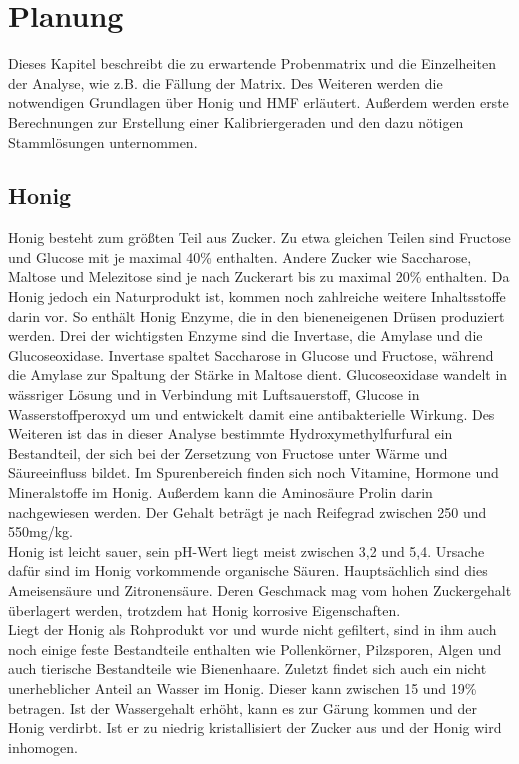 \chapter{Planung}

\label{chap:Planung}
Dieses Kapitel beschreibt die zu erwartende Probenmatrix und die Einzelheiten der Analyse, wie z.B. die Fällung der Matrix. Des Weiteren werden die notwendigen Grundlagen über Honig und HMF erläutert. Außerdem werden erste Berechnungen zur Erstellung einer Kalibriergeraden und den dazu nötigen Stammlösungen unternommen.

\section{Honig}
Honig besteht zum größten Teil aus Zucker. Zu etwa gleichen Teilen sind Fructose und Glucose mit je maximal 40\% enthalten. Andere Zucker wie Saccharose, Maltose und Melezitose sind je nach Zuckerart bis zu maximal 20\% enthalten. Da Honig jedoch ein Naturprodukt ist, kommen noch zahlreiche weitere Inhaltsstoffe darin vor. So enthält Honig Enzyme, die in den bieneneigenen Drüsen produziert werden. Drei der wichtigsten Enzyme sind die Invertase, die Amylase und die Glucoseoxidase. Invertase spaltet Saccharose in Glucose und Fructose, während die Amylase zur Spaltung der Stärke in Maltose dient. Glucoseoxidase wandelt in wässriger Lösung und in Verbindung mit Luftsauerstoff, Glucose in Wasserstoffperoxyd um und entwickelt damit eine antibakterielle Wirkung. Des Weiteren ist das in dieser Analyse bestimmte Hydroxymethylfurfural ein Bestandteil, der sich bei der Zersetzung von Fructose unter Wärme und Säureeinfluss bildet. Im Spurenbereich finden sich noch Vitamine, Hormone und Mineralstoffe im Honig. Außerdem kann die Aminosäure Prolin darin nachgewiesen werden. Der Gehalt beträgt je nach Reifegrad zwischen 250 und 550mg/kg.\\
Honig ist leicht sauer, sein pH-Wert liegt meist zwischen 3,2 und 5,4. Ursache dafür sind im Honig vorkommende organische Säuren. Hauptsächlich sind dies Ameisensäure und Zitronensäure. Deren Geschmack mag vom hohen Zuckergehalt überlagert werden, trotzdem hat Honig korrosive Eigenschaften.\\
Liegt der Honig als Rohprodukt vor und wurde nicht gefiltert, sind in ihm auch noch einige feste Bestandteile enthalten wie Pollenkörner, Pilzsporen, Algen und auch tierische Bestandteile wie Bienenhaare. Zuletzt findet sich auch ein nicht unerheblicher Anteil an Wasser im Honig. Dieser kann zwischen 15 und 19\% betragen. Ist der Wassergehalt erhöht, kann es zur Gärung kommen und der Honig verdirbt. Ist er zu niedrig kristallisiert der Zucker aus und der Honig wird inhomogen.\\
